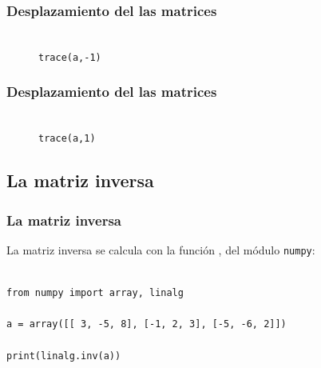 \begin{frame}[fragile]
\frametitle{Desplazamiento del las matrices}
\begin{figure}
	
 \\ \texttt{trace(a,-1)}
\end{figure}
\end{frame}
\begin{frame}[fragile]
\frametitle{Desplazamiento del las matrices}
\begin{figure}
	
 \\ \texttt{trace(a,1)}
\end{figure}
\end{frame}
\subsection{La matriz inversa}
\begin{frame}
\frametitle{La matriz inversa}
La matriz inversa se calcula con la función , del módulo \texttt{numpy}: 
\begin{lstlisting}[caption=Cálculo de la matriz inversa, style=FormattedNumber, basicstyle=\linespread{1.1}\ttfamily=\small, columns=fullflexible]

from numpy import array, linalg

a = array([[ 3, -5, 8], [-1, 2, 3], [-5, -6, 2]])

print(linalg.inv(a))
\end{lstlisting}
\end{frame}

